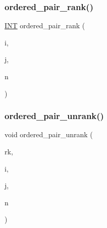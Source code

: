 \subsubsection{\texorpdfstring{ordered\+\_\+pair\+\_\+rank()}{ordered\_pair\_rank()}}
{\footnotesize\ttfamily \mbox{\hyperlink{galois_8h_a09fddde158a3a20bd2dcadb609de11dc}{I\+NT}} ordered\+\_\+pair\+\_\+rank (\begin{DoxyParamCaption}\item[{\mbox{\hyperlink{galois_8h_a09fddde158a3a20bd2dcadb609de11dc}{I\+NT}}}]{i,  }\item[{\mbox{\hyperlink{galois_8h_a09fddde158a3a20bd2dcadb609de11dc}{I\+NT}}}]{j,  }\item[{\mbox{\hyperlink{galois_8h_a09fddde158a3a20bd2dcadb609de11dc}{I\+NT}}}]{n }\end{DoxyParamCaption})}

\mbox{\label{combinatorics_8_c_a8c23cc3f9bdc826d14ad7e64c26a694f}} 
\subsubsection{\texorpdfstring{ordered\+\_\+pair\+\_\+unrank()}{ordered\_pair\_unrank()}}
{\footnotesize\ttfamily void ordered\+\_\+pair\+\_\+unrank (\begin{DoxyParamCaption}\item[{\mbox{\hyperlink{galois_8h_a09fddde158a3a20bd2dcadb609de11dc}{I\+NT}}}]{rk,  }\item[{\mbox{\hyperlink{galois_8h_a09fddde158a3a20bd2dcadb609de11dc}{I\+NT}} \&}]{i,  }\item[{\mbox{\hyperlink{galois_8h_a09fddde158a3a20bd2dcadb609de11dc}{I\+NT}} \&}]{j,  }\item[{\mbox{\hyperlink{galois_8h_a09fddde158a3a20bd2dcadb609de11dc}{I\+NT}}}]{n }\end{DoxyParamCaption})}

\mbox{\label{combinatorics_8_c_a4353faa761b601cd21a5843c6ff2a35e}} 
